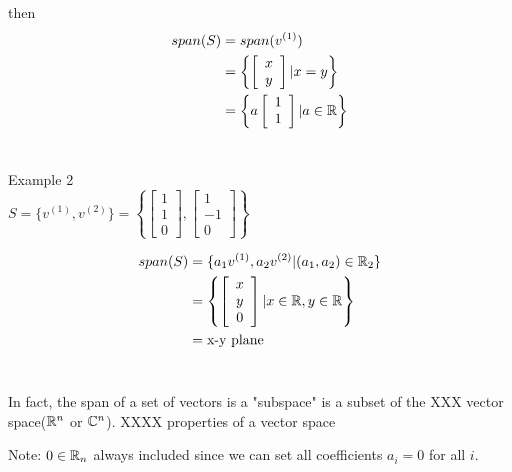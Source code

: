 then
\begin{align*}
span(S)&=span({v^{(1)}})\\
&=\left\{\left[ 
	\begin{array}{c} 
	x \\
	y
	\end{array}
	\right]|x=y\right\}\\
&=\left\{a\left[ 
	\begin{array}{c} 
	1 \\
	1
	\end{array}
	\right]|a\in\mathbb{R}\right\}
\end{align*}\\
\begin{marginfigure}
	\centering
	\resizebox{7.5cm}{3cm}{}
	\caption{}
	\label{fig.2-3}
\end{marginfigure}


Example 2\\
$S=\{v^{(1)}, v^{(2)}\}=\left\{\left[ 
\begin{array}{c} 
1\\
1\\
0
\end{array}
\right],           
\left[ 
\begin{array}{c} 
1\\
-1\\
0
\end{array}
\right]
\right\}$

\begin{align*}
span(S)&=\{a_{1}v^{(1)}, a_{2}v^{(2)}|(a_{1}, a_{2})\in \mathbb{R}_{2}\}\\
&=\left\{\left[ 
	\begin{array}{c} 
	x\\
	y\\
	0
	\end{array}
	\right] |x\in\mathbb{R} , y\in\mathbb{R}\right\}\\
&=\text{x-y plane}
\end{align*}\\
\begin{marginfigure}
	\centering
	\resizebox{7.5cm}{3cm}{}
	\caption{}
	\label{fig.2-4}
\end{marginfigure}


In fact, the span of a set of vectors is a "subspace" is a subset of the XXX vector space($\mathbb{R}^{n}$ or $\mathbb{C}^{n}$). XXXX properties of a vector space

Note: $0\in\mathbb{R}_{n}$ always included since we can set all coefficients $a_{i}=0$ for all $i$.

